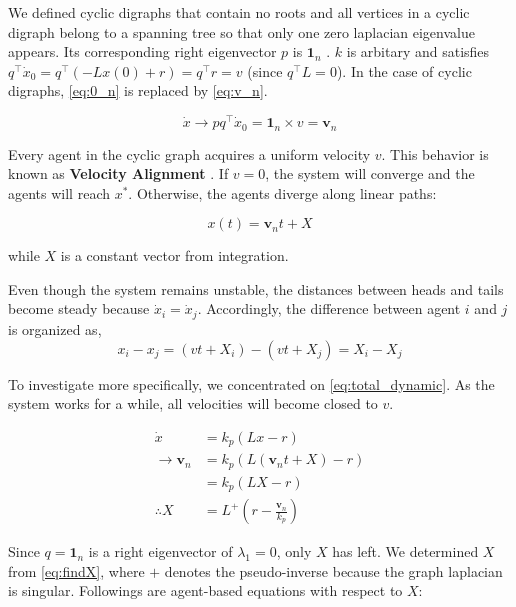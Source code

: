 \documentclass[letterpaper, 10 pt, conference]{ieeeconf}  %
\begin{document}
We defined cyclic digraphs that contain no roots and all vertices in a cyclic digraph belong to a spanning tree so that only one zero laplacian eigenvalue appears. Its corresponding right eigenvector \( p \) is \( \mathbf{1}_n \) \cite{olfati-saber_consensus_2007}. \( k \) is arbitary and satisfies \( q^\top \dot{x}_0 = q^\top (-Lx(0) + r) = q^\top r = v \) (since \( q^\top L = 0 \)). In the case of cyclic digraphs, \eqref{eq:0_n} is replaced by \eqref{eq:v_n}.

\begin{equation}\label{eq:v_n}
    \dot{x} \rightarrow pq^\top \dot{x}_0 = \mathbf{1}_n \times v = \mathbf{v}_n
\end{equation}

\noindent Every agent in the cyclic graph acquires a uniform velocity \( v \). This behavior is known as \textbf{Velocity Alignment} \cite{dimarogonas_connection_2008}. If \( v = 0 \), the system will converge and the agents will reach \( x^* \). Otherwise, the agents diverge along linear paths:

\[
x(t) = \mathbf{v}_n t + X 
\]

\noindent while \( X \) is a constant vector from integration.


Even though the system remains unstable, the distances between heads and tails become steady because \( \dot{x}_i = \dot{x}_j \). Accordingly, the difference between agent $i$ and $j$ is organized as,
\[
x_i - x_j = (vt + X_i) - (vt +X_j) = X_i-X_j
\]

To investigate more specifically, we concentrated on \eqref{eq:total_dynamic}. As the system works for a while, all velocities will become closed to \(v\). 

\begin{equation}\label{eq:findX}
\begin{split}
    \dot{x} &= k_p(Lx - r) \\
   \rightarrow  \mathbf{v}_n &= k_p(L(\mathbf{v}_nt + X) - r) \\
           &= k_p(LX - r)  \\ 
 \therefore X &= L^+ (r - \frac{\mathbf{v}_n}{k_p})
\end{split}
\end{equation}



Since \(q=\mathbf{1}_n\) is a right eigenvector of \(\lambda_1 = 0\), only \(X\) has left. We determined \( X \) from \eqref{eq:findX}, where \( + \) denotes the pseudo-inverse because the graph laplacian is singular. Followings are agent-based equations with respect to \(X\):
\end{document}
